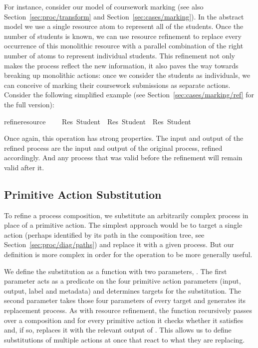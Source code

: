 \documentclass[class=smolathesis,crop=false]{standalone}
\begin{document}
For instance, consider our model of coursework marking (see also Section~\ref{sec:proc/transform} and Section~\ref{sec:cases/marking}).
In the abstract model we use a single resource atom to represent all of the students.
Once the number of students is known, we can use resource refinement to replace every occurrence of this monolithic resource with a parallel combination of the right number of atoms to represent individual students.
This refinement not only makes the process reflect the new information, it also paves the way towards breaking up monolithic actions: once we consider the students as individuals, we can conceive of marking their coursework submissions as separate actions.
Consider the following simplified example (see Section~\ref{sec:cases/marking/ref} for the full version):
\begin{isabelle}
\centering
  refine{\isacharunderscore}resource\ \ \ \isanewline
  \isacharequal\ Res\ Student\ \isasymodot\ Res\ Student\ \isasymodot\ Res\ Student
\end{isabelle}

Once again, this operation has strong properties.
The input and output of the refined process are the input and output of the original process, refined accordingly.
And any process that was valid before the refinement will remain valid after it.

\subsection{Primitive Action Substitution}
\label{sec:proc/transform/proc-subst}

To refine a process composition, we substitute an arbitrarily complex process in place of a primitive action.
The simplest approach would be to target a single action (perhaps identified by its path in the composition tree, see Section~\ref{sec:proc/diag/paths}) and replace it with a given process.
But our definition is more complex in order for the operation to be more generally useful.

We define the substitution as a function with two parameters, .
The first parameter acts as a predicate on the four primitive action parameters (input, output, label and metadata) and determines targets for the substitution.
The second parameter takes those four parameters of every target and generates its replacement process.
As with resource refinement, the function recursively passes over a composition and for every primitive action it checks whether it satisfies  and, if so, replaces it with the relevant output of .
This allows us to define substitutions of multiple actions at once that react to what they are replacing.
\end{document}
